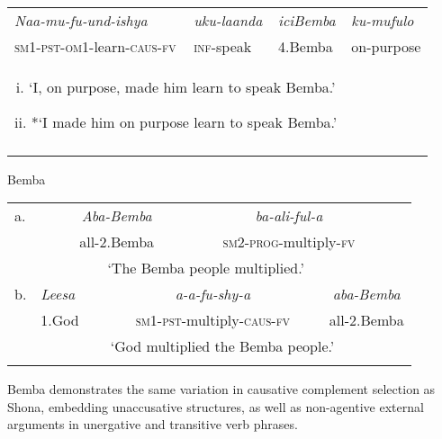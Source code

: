 \documentclass[output=paper]{langscibook}
\begin{document}
\ea\label{ex:wechsler:5}
\\

\tablefirsthead{}

\tabletail{}
\tablelasttail{}
\begin{tabularx}{\textwidth}{XXXX}
\lsptoprule
{\itshape Naa-mu-fu-und-ishya} & \textit{uku-laanda} & {\itshape iciBemba} & {\itshape ku-mufulo}\\
\textsc{sm}1\textsc{{}-pst-om1}{}-learn-\textsc{caus-fv} & \textsc{inf-}speak & 4.Bemba & on-purpose\\
\multicolumn{3}{c}{i. ‘I, on purpose, made him learn to speak Bemba.’

ii. *‘I made him on purpose learn to speak Bemba.’} & \\
\lspbottomrule
\end{tabularx}
\z

\ea\label{ex:wechsler:6}
Bemba \citep[155]{Givón1969}\\

\tablefirsthead{}

\tabletail{}
\tablelasttail{}
\begin{tabularx}{\textwidth}{XXXXXX}
\lsptoprule
a. & \multicolumn{2}{c}{{\itshape Aba-Bemba}} & \multicolumn{2}{c}{\textit{ba-ali-ful-a}} & \\
& \multicolumn{2}{c}{all-2.Bemba}  & \multicolumn{2}{c}{\textsc{sm2}{}-\textsc{prog}{}-multiply-\textsc{fv}} & \\
& \multicolumn{4}{c}{‘The Bemba people multiplied.’} & \\
b. & {\itshape Leesa} & \multicolumn{2}{c}{{\itshape a-a-fu-shy-a} } & \multicolumn{2}{c}{{\itshape aba-Bemba}}\\
& 1.God & \multicolumn{2}{c}{\textsc{sm1-pst}{}-multiply-\textsc{caus}{}-\textsc{fv}} & \multicolumn{2}{c}{all-2.Bemba}\\
& \multicolumn{5}{c}{‘God multiplied the Bemba people.’}\\
\lspbottomrule
\end{tabularx}
\z

Bemba demonstrates the same variation in causative complement selection as Shona, embedding unaccusative structures, as well as non-agentive external arguments in unergative and transitive verb phrases. 
\end{document}

